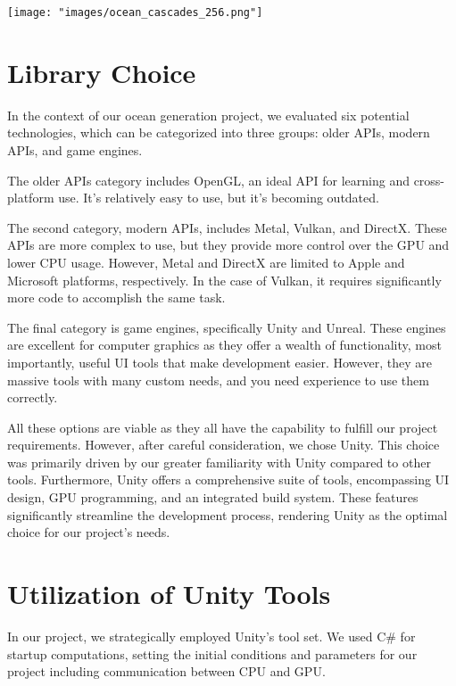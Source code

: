 \begin{minipage}{1\textwidth}
    \centering
    \texttt{[image: "images/ocean\_cascades\_256.png"]}
    \label{fig:ocean_with_cascades_256}
\end{minipage}

\section{Library Choice}

In the context of our ocean generation project, we evaluated six potential technologies, which can be categorized into three groups: older APIs, modern APIs, and game engines.

The older APIs category includes OpenGL, an ideal API for learning and cross-platform use. It’s relatively easy to use, but it’s becoming outdated.

The second category, modern APIs, includes Metal, Vulkan, and DirectX. These APIs are more complex to use, but they provide more control over the GPU and lower CPU usage. However, Metal and DirectX are limited to Apple and Microsoft platforms, respectively. In the case of Vulkan, it requires significantly more code to accomplish the same task.

The final category is game engines, specifically Unity and Unreal. These engines are excellent for computer graphics as they offer a wealth of functionality, most importantly, useful UI tools that make development easier. However, they are massive tools with many custom needs, and you need experience to use them correctly.

All these options are viable as they all have the capability to fulfill our project requirements. However, after careful consideration, we chose Unity. This choice was primarily driven by our greater familiarity with Unity compared to other tools. Furthermore, Unity offers a comprehensive suite of tools, encompassing UI design, GPU programming, and an integrated build system. These features significantly streamline the development process, rendering Unity as the optimal choice for our project's needs.

\section{Utilization of Unity Tools}
In our project, we strategically employed Unity’s tool set. We used C\# for startup computations, setting the initial conditions and parameters for our project including communication between CPU and GPU.

